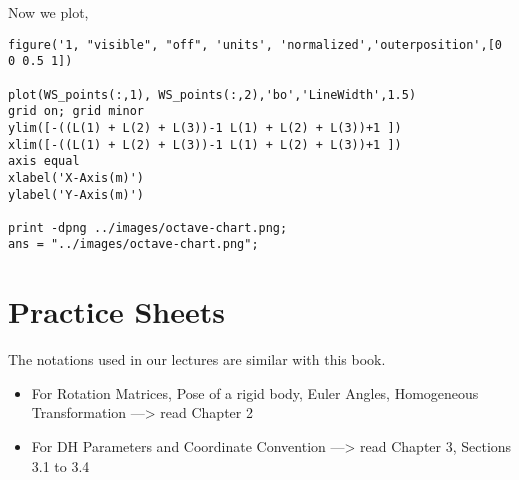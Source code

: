\documentclass[11pt]{report}
\begin{document}
\begin{enumerate}
\begin{enumerate}
\begin{enumerate}
Now we plot,
\begin{verbatim}
figure('1, "visible", "off", 'units', 'normalized','outerposition',[0 0 0.5 1])

plot(WS_points(:,1), WS_points(:,2),'bo','LineWidth',1.5)
grid on; grid minor
ylim([-((L(1) + L(2) + L(3))-1 L(1) + L(2) + L(3))+1 ])
xlim([-((L(1) + L(2) + L(3))-1 L(1) + L(2) + L(3))+1 ])
axis equal
xlabel('X-Axis(m)')
ylabel('Y-Axis(m)')

print -dpng ../images/octave-chart.png;
ans = "../images/octave-chart.png";
\end{verbatim}
\end{enumerate}
\end{enumerate}
\end{enumerate}
\part{Practice Sheets}
\label{sec:orgddca157}
The notations used in our lectures are similar with this book.

\begin{itemize}
\item For Rotation Matrices, Pose of a rigid body, Euler Angles, Homogeneous Transformation ---> read Chapter 2
\item For DH Parameters and Coordinate Convention ---> read Chapter 3, Sections 3.1 to 3.4
\end{itemize}
\end{document}
